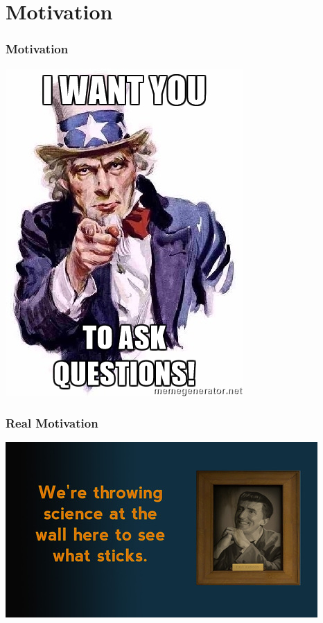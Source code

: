 \documentclass{beamer}
\begin{document}
\section{Motivation}
\begin{frame}
\frametitle{Motivation}
	\begin{center}
		\includegraphics[scale=0.6]{./images/uncle_sam.jpg}
	\end{center}
\end{frame}

\begin{frame}
	\frametitle{Real Motivation}
	\href{run:./sound/Cave_Johnson_athletes.wav}{}
	\begin{center}
		\includegraphics[scale=0.5]{./images/cave_johnson.jpg}
	\end{center}
\end{frame}
\end{document}
